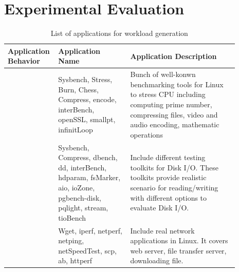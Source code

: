 \documentclass[10pt, conference, compsocconf]{IEEEtran}
\begin{document}
\section{Experimental Evaluation}\label{sec:exp}

\begin{table}
\caption{List of applications for workload generation}
\centering
\begin{tabular}{M{0.14\linewidth}M{0.30\linewidth}M{0.45\linewidth}}
  \hline
  \footnotesize \textbf{Application Behavior} & \footnotesize \textbf{Application Name} & \footnotesize \textbf{Application Description} \\
  \hline
  \hline
    \footnotesize {} & \footnotesize Sysbench, Stress, Burn, Chess, Compress, encode, interBench, openSSL, smallpt, infinitLoop  & Bunch of well-konwn benchmarking tools for Linux to stress CPU including computing prime number, compressing files, video and audio encoding, mathematic operations \\  \hline
  \footnotesize  {} & \footnotesize Sysbench, Compress, dbench, dd, interBench, hdparam, fsMarker, aio, ioZone, pgbench-disk, pqlight, stream, tioBench & Include different testing toolkits for Disk I/O. These toolkits provide realistic scenario for reading/writing with different options to evaluate Disk I/O.  \\  \hline
   \footnotesize  {} & \footnotesize  Wget, iperf, netperf, netping, netSpeedTest, scp, ab, httperf & Include real network applications in Linux. It covers web server, file transfer server, downloading file.    \\
  \hline
\end{tabular}
\label{tab:notation}
\end{table}
\end{document}
